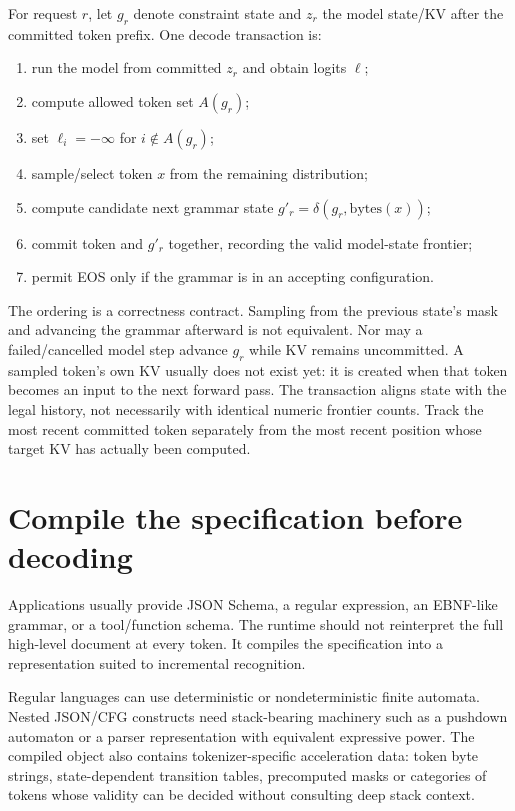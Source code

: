 For request $r$, let $g_r$ denote constraint state and $z_r$ the model state/KV after
the committed token prefix. One decode transaction is:

\begin{enumerate}
\item run the model from committed $z_r$ and obtain logits $\ell$;
\item compute allowed token set $A(g_r)$;
\item set $\ell_i=-\infty$ for $i\notin A(g_r)$;
\item sample/select token $x$ from the remaining distribution;
\item compute candidate next grammar state $g'_r=\delta(g_r,\mathrm{bytes}(x))$;
\item commit token and $g'_r$ together, recording the valid model-state frontier;
\item permit EOS only if the grammar is in an accepting configuration.
\end{enumerate}

The ordering is a correctness contract. Sampling from the previous state's mask and
advancing the grammar afterward is not equivalent. Nor may a failed/cancelled model
step advance $g_r$ while KV remains uncommitted. A sampled token's own KV
usually does not exist yet: it is created when that token becomes an input
to the next forward pass. The transaction aligns state with the legal
history, not necessarily with identical numeric frontier counts. Track
the most recent committed token separately from the most recent position
whose target KV has actually been computed.


\section{Compile the specification before decoding}

Applications usually provide JSON Schema, a regular expression, an EBNF-like grammar,
or a tool/function schema. The runtime should not reinterpret the full high-level
document at every token. It compiles the specification into a representation suited
to incremental recognition.

Regular languages can use deterministic or nondeterministic finite automata. Nested
JSON/CFG constructs need stack-bearing machinery such as a pushdown automaton or a
parser representation with equivalent expressive power. The compiled object also
contains tokenizer-specific acceleration data: token byte strings, state-dependent
transition tables, precomputed masks or categories of tokens whose validity can be
decided without consulting deep stack context.

